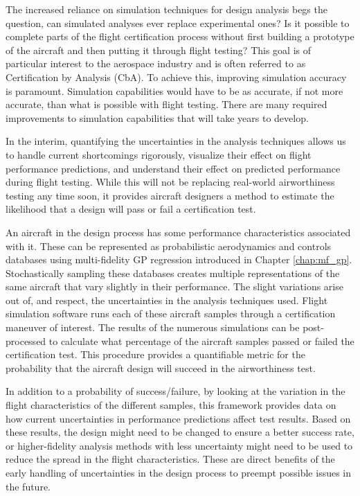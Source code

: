 The increased reliance on simulation techniques for design analysis begs the question, can simulated analyses ever replace experimental ones?
Is it possible to complete parts of the flight certification process without first building a prototype of the aircraft and then putting it through flight testing?
This goal is of particular interest to the aerospace industry and is often referred to as Certification by Analysis (CbA).
To achieve this, improving simulation accuracy is paramount. 
Simulation capabilities would have to be as accurate, if not more accurate, than what is possible with flight testing.  
There are many required improvements to simulation capabilities \cite{slotnick_cfd_nodate} that will take years to develop.

In the interim, quantifying the uncertainties in the analysis techniques allows us to handle current shortcomings rigorously, visualize their effect on flight performance predictions, and understand their effect on predicted performance during flight testing.
While this will not be replacing real-world airworthiness testing any time soon, it provides aircraft designers a method to estimate the likelihood that a design will pass or fail a certification test. 

An aircraft in the design process has some performance characteristics associated with it.
These can be represented as probabilistic aerodynamics and controls databases using multi-fidelity GP regression introduced in Chapter \ref{chap:mf_gp}.
Stochastically sampling these databases creates multiple representations of the same aircraft that vary slightly in their performance.
The slight variations arise out of, and respect, the uncertainties in the analysis techniques used. 
Flight simulation software runs each of these aircraft samples through a certification maneuver of interest.
The results of the numerous simulations can be post-processed to calculate what percentage of the aircraft samples passed or failed the certification test.
This procedure provides a quantifiable metric for the probability that the aircraft design will succeed in the airworthiness test.

In addition to a probability of success/failure, by looking at the variation in the flight characteristics of the different samples, this framework provides data on how current uncertainties in performance predictions affect test results.
Based on these results, the design might need to be changed to ensure a better success rate, or higher-fidelity analysis methods with less uncertainty might need to be used to reduce the spread in the flight characteristics. 
These are direct benefits of the early handling of uncertainties in the design process to preempt possible issues in the future. 


